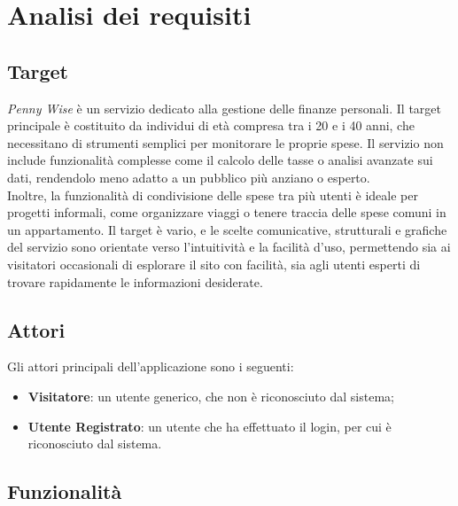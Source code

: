 \section{Analisi dei requisiti}

\subsection{Target}

\textit{Penny Wise} è un servizio dedicato alla gestione delle finanze personali. Il target principale è costituito da individui di età compresa tra i 20 e i 40 anni, che necessitano di strumenti semplici per monitorare le proprie spese. Il servizio non include funzionalità complesse come il calcolo delle tasse o analisi avanzate sui dati, rendendolo meno adatto a un pubblico più anziano o esperto.\\

Inoltre, la funzionalità di condivisione delle spese tra più utenti è ideale per progetti informali, come organizzare viaggi o tenere traccia delle spese comuni in un appartamento. Il target è vario, e le scelte comunicative, strutturali e grafiche del servizio sono orientate verso l'intuitività e la facilità d'uso, permettendo sia ai visitatori occasionali di esplorare il sito con facilità, sia agli utenti esperti di trovare rapidamente le informazioni desiderate.

\subsection{Attori}

Gli attori principali dell'applicazione sono i seguenti:

\begin{itemize}
    \item \textbf{Visitatore}: un utente generico, che non è riconosciuto dal sistema;

    \item \textbf{Utente Registrato}: un utente che ha effettuato il login, per cui è riconosciuto dal sistema.
\end{itemize}

\subsection{Funzionalità}

